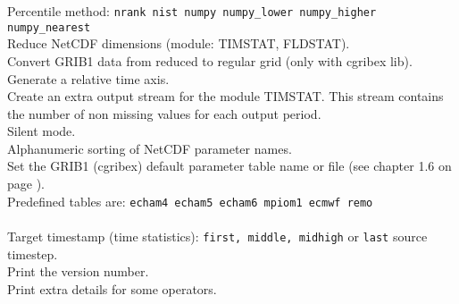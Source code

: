 \begin{tabbing}
\makebox[1.5in][l]{\hspace*{1cm}}
         \> Percentile method: \texttt{nrank nist numpy numpy\_lower numpy\_higher numpy\_nearest} \\
         \> Reduce NetCDF dimensions (module: TIMSTAT, FLDSTAT). \\
         \> Convert GRIB1 data from reduced to regular grid (only with cgribex lib). \\
         \> Generate a relative time axis. \\
         \> Create an extra output stream for the module TIMSTAT. This stream contains  \\
         \> the number of non missing values for each output period. \\
         \> Silent mode. \\
         \> Alphanumeric sorting of NetCDF parameter names. \\
         \> Set the GRIB1 (cgribex) default parameter table name or file (see chapter 1.6 on page \pageref{PARAMETER_TABLE}).\\
         \> Predefined tables are:  \texttt{echam4 echam5 echam6 mpiom1 ecmwf remo}\\
         \> \\
\makebox[1.5in][l]{\hspace*{1cm}}
         \> Target timestamp (time statistics): \texttt{first, middle, midhigh} or \texttt{last} source timestep. \\
         \> Print the version number. \\
         \> Print extra details for some operators. \\

\end{tabbing}
